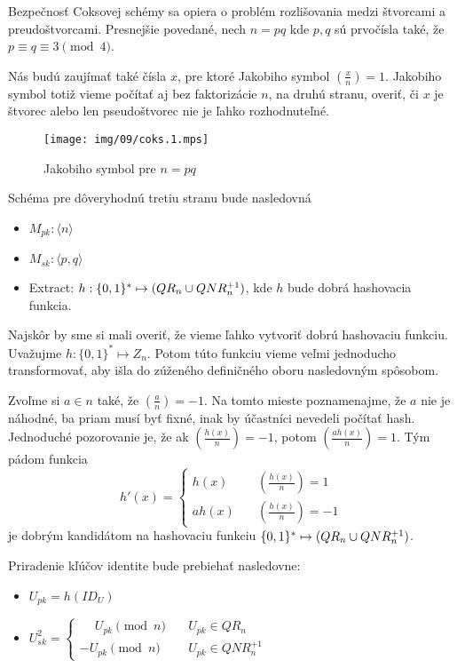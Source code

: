 Bezpečnosť Coksovej schémy \cite{cocks} sa opiera o problém rozlišovania medzi
štvorcami a preudoštvorcami. Presnejšie povedané,
nech $n=pq$ kde $p,q$ sú prvočísla také, že $p \equiv q \equiv 3 \pmod{4}$.

\def\jacobi#1#2{\left( \frac{#1}{#2} \right)}

Nás budú zaujímať také čísla $x$, pre ktoré Jakobiho symbol
$\jacobi{x}{n} =1$. Jakobiho symbol totiž vieme počítať aj bez
faktorizácie $n$, na druhú stranu, overiť, či $x$ je štvorec alebo len
pseudoštvorec nie je ľahko rozhodnuteľné.

\begin{figure}[h]
    \centering
    \texttt{[image: img/09/coks.1.mps]}
    \caption{Jakobiho symbol pre $n=pq$}
    \label{fig:jakobi}
\end{figure}


Schéma pre dôveryhodnú tretiu stranu bude nasledovná
\begin{itemize}
    \item $M_{pk}: \langle n \rangle$
    \item $M_{sk}: \langle p,q \rangle$
    \item Extract: $h: \{0,1\}^* \mapsto (QR_n \cup QNR_n^{+1})$,
    kde $h$ bude dobrá hashovacia funkcia.
\end{itemize}

Najskôr by sme si mali overiť, že vieme ľahko vytvoriť dobrú
hashovaciu funkciu. Uvažujme $h:\{0,1\}^* \mapsto Z_n$.
Potom túto funkciu vieme veľmi jednoducho transformovať, aby išla do
zúženého definičného oboru nasledovným spôsobom.

Zvoľme si $a \in n$ také, že $\jacobi{a}{n} = -1$. Na tomto mieste
poznamenajme, že $a$ nie je náhodné, ba priam musí byť fixné, inak by
účastníci nevedeli počítať hash.
Jednoduché pozorovanie je, že ak $\jacobi{h(x)}{n}=-1$,
potom $\jacobi{a h(x)}{n}=1$.
Tým pádom funkcia
\begin{equation*}
h'(x) = \begin{cases}
            h(x)   \quad &\jacobi{h(x)}{n}=1 \\
            a h(x) \quad &\jacobi{h(x)}{n}=-1
        \end{cases}
\end{equation*}
je dobrým kandidátom na hashovaciu funkciu
$\{0,1\}^* \mapsto (QR_n \cup QNR_n^{+1})$.

Priradenie kľúčov identite bude prebiehať nasledovne:
\begin{itemize}
    \item $U_{pk}=h(ID_U)$

    \item $U_{sk}^2=\begin{cases}
            \phantom{-} U_{pk}\pmod{n}  \quad& U_{pk} \in QR_n \\
                     -  U_{pk}\pmod{n}  \quad& U_{pk} \in QNR_n^{+1}
                    \end{cases}$
\end{itemize}

